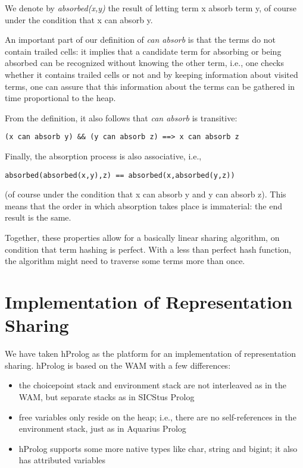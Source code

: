 \documentclass{tlp}
\begin{document}
We denote by {\em absorbed(x,y)} the result of letting term x absorb
term y, of course under the condition that x can absorb y.

An important part of our definition of {\em can absorb} is that the
terms do not contain trailed cells: it implies that a candidate term
for absorbing or being absorbed can be recognized without knowing the
other term, i.e., one checks whether it contains trailed cells or not
and by keeping information about visited terms, one can assure that
this information about the terms can be gathered in time proportional
to the heap.

From the definition, it also follows that {\em can absorb} is
transitive:
\begin{Verbatim}[fontsize=\small, frame=single,samepage=true]
       (x can absorb y) && (y can absorb z) ==> x can absorb z
\end{Verbatim}

Finally, the absorption process is also associative, i.e.,
\begin{Verbatim}[fontsize=\small, frame=single,samepage=true]
       absorbed(absorbed(x,y),z) == absorbed(x,absorbed(y,z))
\end{Verbatim}
(of course under the condition that x can absorb y and y can absorb z).
This means that the order in which absorption takes place is
immaterial: the end result is the same.

Together, these properties allow for a basically linear sharing
algorithm, on condition that term hashing is perfect. With a less than
perfect hash function, the algorithm might need to traverse some terms
more than once.

\section{Implementation of Representation Sharing}\label{implementation}

We have taken hProlog as the platform for an implementation of
representation sharing. hProlog is based on the WAM
\cite{wam:hassan,DHWa83} with a few differences:
\begin{itemize}
\item 
the choicepoint stack and environment stack are not interleaved as in
the WAM, but separate stacks as in SICStus Prolog
\item 
free variables only reside on the heap; i.e., there are no
self-references in the environment stack, just as in Aquarius Prolog
\cite{Aquarius}
\item 
hProlog supports some more native types like char, string and bigint;
it also has attributed variables
\end{itemize}
\end{document}
